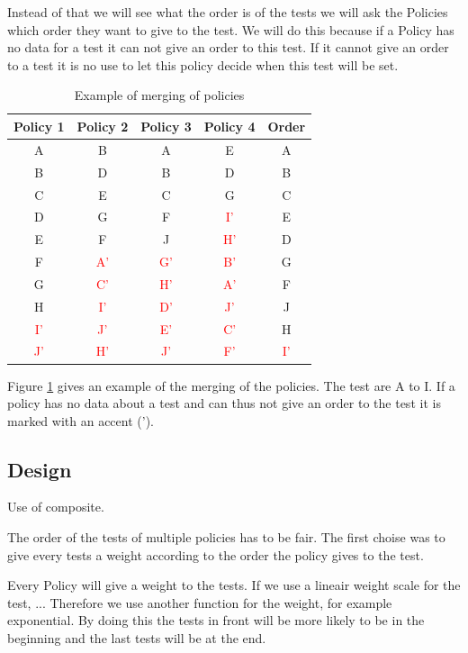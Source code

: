 \documentclass[i2]{oss}
\newcommand{\col}[1]{\textcolor{red}{#1}}
\begin{document}
Instead of that we will see what the order is of the tests we will ask the Policies which order they want to give to the test. We will do this because if a Policy has no data for a test it can not give an order to this test. If it cannot give an order to a test it is no use to let this policy decide when this test will be set. 


\begin{table}[h!]
\begin{center}
    \begin{tabular}{ c  c  c  c | c}
     Policy 1 & Policy 2 & Policy 3 & Policy 4 & Order  \\ \hline
    	A & B & A & E & A \\
        B & D & B & D & B \\
        C & E & C & G & C\\
        D & G & F & \col{I'} & E \\
        E & F & J & \col{H'} & D \\
        F & \col{A'} & \col{G'} & \col{B'} & G \\
        G & \col{C'} & \col{H'} & \col{A'} & F \\
        H & \col{I'} & \col{D'} & \col{J'} & J \\
        \col{I'} & \col{J'} & \col{E'} & \col{C'} & H \\
        \col{J'} & \col{H'} & \col{J'} & \col{F'} & \col{I'} \\
    \end{tabular}
    \caption{Example of merging of policies }
    \label{fig:orderex}
    \end{center}
\end{table}

Figure \ref{fig:orderex} gives an example of the merging of the policies. The test are A to I. If a policy has no data about a test and can thus not give an order to the test it is marked with an accent ('). 


\subsection{Design}

Use of composite. 

The order of the tests of multiple policies has to be fair. The first choise was to give every tests a weight according to the order the policy gives to the test. 


Every Policy will give a weight to the tests. If we use a lineair weight scale for the test, ... 
Therefore we use another function for the weight, for example exponential. By doing this the tests in front will be more likely to be in the beginning and the last tests will be at the end. 
\end{document}
